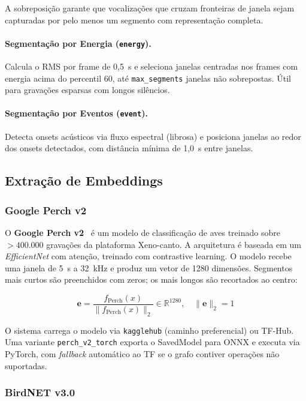 \documentclass[12pt,a4paper]{article}
\begin{document}
A sobreposição garante que vocalizações que cruzam fronteiras de janela sejam
capturadas por pelo menos um segmento com representação completa.

\paragraph{Segmentação por Energia (\texttt{energy}).}
Calcula o RMS por frame de 0,5~s e seleciona janelas centradas nos frames com
energia acima do percentil 60, até \texttt{max\_segments} janelas não sobrepostas.
Útil para gravações esparsas com longos silêncios.

\paragraph{Segmentação por Eventos (\texttt{event}).}
Detecta onsets acústicos via fluxo espectral (librosa) e posiciona janelas ao
redor dos onsets detectados, com distância mínima de 1,0~s entre janelas.

\subsection{Extração de Embeddings}

\subsubsection{Google Perch v2}

O \textbf{Google Perch v2}~\cite{merriënboer:25} é um modelo de classificação
de aves treinado sobre $>400.000$ gravações da plataforma Xeno-canto. A
arquitetura é baseada em um \emph{EfficientNet} com atenção, treinado com
contrastive learning. O modelo recebe uma janela de 5~s a 32~kHz e produz
um vetor de 1280 dimensões. Segmentos mais curtos são preenchidos com zeros;
os mais longos são recortados ao centro:

\begin{equation}
  \mathbf{e} = \frac{f_{\text{Perch}}(x)}{\|f_{\text{Perch}}(x)\|_2}
  \in \mathbb{R}^{1280},\quad \|\mathbf{e}\|_2 = 1
  \label{eq:perch}
\end{equation}

O sistema carrega o modelo via \texttt{kagglehub} (caminho preferencial) ou
TF-Hub. Uma variante \texttt{perch\_v2\_torch} exporta o SavedModel para ONNX
e executa via PyTorch, com \emph{fallback} automático ao TF se o grafo contiver
operações não suportadas.

\subsubsection{BirdNET v3.0}
\end{document}
